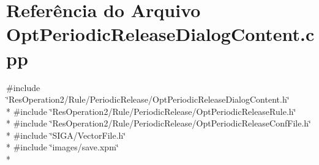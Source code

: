 \section{Referência do Arquivo Opt\+Periodic\+Release\+Dialog\+Content.\+cpp}
\label{_opt_periodic_release_dialog_content_8cpp}
{\ttfamily \#include \char`\"{}Res\+Operation2/\+Rule/\+Periodic\+Release/\+Opt\+Periodic\+Release\+Dialog\+Content.\+h\char`\"{}}\\*
{\ttfamily \#include \char`\"{}Res\+Operation2/\+Rule/\+Periodic\+Release/\+Opt\+Periodic\+Release\+Rule.\+h\char`\"{}}\\*
{\ttfamily \#include \char`\"{}Res\+Operation2/\+Rule/\+Periodic\+Release/\+Opt\+Periodic\+Release\+Conf\+File.\+h\char`\"{}}\\*
{\ttfamily \#include \char`\"{}S\+I\+G\+A/\+Vector\+File.\+h\char`\"{}}\\*
{\ttfamily \#include \char`\"{}images/save.\+xpm\char`\"{}}\\*
